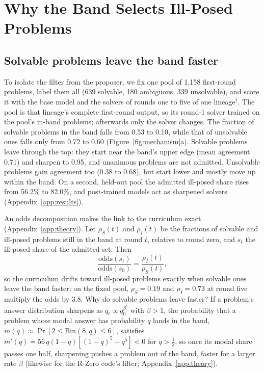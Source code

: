 \section{Why the Band Selects Ill-Posed Problems}
\label{sec:mechanism}

\subsection{Solvable problems leave the band faster}
\label{sec:exit}

To isolate the filter from the proposer, we fix one pool of 1,158 first-round problems, label them all (639 solvable, 180 ambiguous, 339 unsolvable), and score it with the base model and the solvers of rounds one to five of one lineage$^{\dagger}$. The pool is that lineage's complete first-round output, so its round-1 solver trained on the pool's in-band problems; afterwards only the solver changes. The fraction of solvable problems in the band falls from 0.53 to 0.10, while that of unsolvable ones falls only from 0.72 to 0.60 (Figure~\ref{fig:mechanism}a). Solvable problems leave through the top: they start near the band's upper edge (mean agreement 0.71) and sharpen to 0.95, and unanimous problems are not admitted. Unsolvable problems gain agreement too (0.38 to 0.68), but start lower and mostly move up within the band. On a second, held-out pool the admitted ill-posed share rises from 56.2\% to 82.0\%, and post-trained models act as sharpened solvers (Appendix~\ref{app:results}).

An odds decomposition makes the link to the curriculum exact (Appendix~\ref{app:theory}). Let $\rho_S(t)$ and $\rho_I(t)$ be the fractions of solvable and ill-posed problems still in the band at round $t$, relative to round zero, and $s_t$ the ill-posed share of the admitted set. Then
\begin{equation}
\frac{\mathrm{odds}(s_t)}{\mathrm{odds}(s_0)} = \frac{\rho_I(t)}{\rho_S(t)} ,
\label{eq:odds}
\end{equation}
so the curriculum drifts toward ill-posed problems exactly when solvable ones leave the band faster; on the fixed pool, $\rho_S = 0.19$ and $\rho_I = 0.73$ at round five multiply the odds by 3.8. Why do solvable problems leave faster? If a problem's answer distribution sharpens as $q_t \propto q_0^{\beta^t}$ with $\beta > 1$, the probability that a problem whose modal answer has probability $q$ lands in the band, $m(q) \approx \Pr[2 \le \mathrm{Bin}(8, q) \le 6]$, satisfies $m'(q) = 56\, q (1-q) [ (1-q)^5 - q^5 ] < 0$ for $q > \frac{1}{2}$, so once its modal share passes one half, sharpening pushes a problem out of the band, faster for a larger rate $\beta$ (likewise for the R-Zero code's filter; Appendix~\ref{app:theory}).

